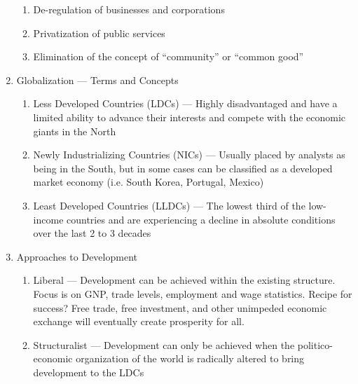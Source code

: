 \documentclass[12pt]{article}
\begin{document}
\begin{enumerate}
\begin{enumerate}
          \item De-regulation of businesses and corporations

          \item Privatization of public services

          \item Elimination of the concept of “community” or “common good”

        \end{enumerate}

      \item Globalization — Terms and Concepts

        \begin{enumerate}

          \item Less Developed Countries (LDCs) — Highly disadvantaged and have a limited ability to advance their interests and compete with the economic giants in the North

          \item Newly Industrializing Countries (NICs) — Usually placed by analysts as being in the South, but in some cases can be classified as a developed market economy (i.e. South Korea, Portugal, Mexico)

          \item Least Developed Countries (LLDCs) — The lowest third of the low- income countries and are experiencing a decline in absolute conditions over the last 2 to 3 decades

        \end{enumerate}

      \item Approaches to Development

        \begin{enumerate}

          \item Liberal — Development can be achieved within the existing structure. Focus is on GNP, trade levels, employment and wage statistics. Recipe for success? Free trade, free investment, and other unimpeded economic exchange will eventually create prosperity for all.

          \item Structuralist — Development can only be achieved when the politico-economic organization of the world is radically altered to bring development to the LDCs

            \begin{enumerate}


\end{enumerate}
\end{enumerate}
\end{enumerate}
\end{document}
